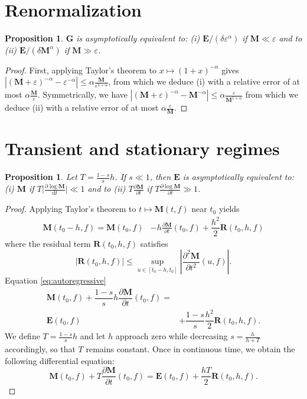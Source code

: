 \documentclass[journal]{IEEEtran}
\newtheorem{prop}[thm]{Proposition}
\begin{document}
\section{Renormalization}
\begin{prop}
$\mathbf{G}$ is asymptotically equivalent to: (i) $\mathbf{E} / (\delta \varepsilon^\alpha)$ if $\mathbf{M} \ll \varepsilon$ and to (ii) $\mathbf{E} / (\delta \mathbf{M}^\alpha)$ if $\mathbf{M} \gg \varepsilon$.
\end{prop}
\begin{proof}
First, applying Taylor's theorem to $x \mapsto (1+x)^{-\alpha}$ gives $\left \vert (\mathbf{M} + \varepsilon)^{-\alpha} - \varepsilon^{-\alpha} \right \vert \leq \alpha \frac{\mathbf{M}}{\varepsilon^{1+\alpha}}$, from which we deduce (i) with a relative error of at most $\alpha \frac{\mathbf{M}}{\varepsilon}$. Symmetrically, we have $\left \vert (\mathbf{M} + \varepsilon)^{-\alpha} - \mathbf{M}^{-\alpha} \right \vert \leq \alpha \frac{\varepsilon}{\mathbf{M}^{1+\alpha}}$ from which we deduce (ii) with a relative error of at most $\alpha \frac{\varepsilon}{\mathbf{M}}$.
\end{proof}

\section{Transient and stationary regimes}
\begin{prop}
Let $T=\frac{1-s}{s} h$.
If $s \ll 1$, then $\mathbf{E}$ is asymptotically equivalent to: (i) $\mathbf{M}$ if $T \vert\frac{\partial \log \mathbf{M}}{\mathrm{d}t} \vert \ll 1$ and to (ii) $T \frac{\partial\mathbf{M}}{\partial t}$ if $T \frac{\partial \log \mathbf{M}}{\partial t} \gg 1$.
\end{prop}
\begin{proof}
Applying Taylor's theorem to $t \mapsto \mathbf{M}(t,f)$ near $t_0$ yields
\begin{align}
\mathbf{M}(t_0-h,f)
=
\mathbf{M}(t_0,f) & - h \frac{\partial\mathbf{M}}{\partial t}(t_0,f) + \dfrac{h^2}{2} \mathbf{R}(t_0,h,f)
\end{align}
where the residual term $\mathbf{R}(t_0,h,f)$ satisfies
\begin{equation}
\vert \mathbf{R}(t_0,h,f) \vert
\leq
\sup_{u \in [t_0-h, t_0]}
\left \vert
\dfrac{\partial^2 \mathbf{M}}{\partial t^2}(u,f)
\right \vert.
\end{equation}
Equation \ref{eq:autoregressive}
\begin{align}
\mathbf{M}(t_0,f) 
+
\dfrac{1-s}{s} h \dfrac{\partial \mathbf{M}}{\partial t}(t_0,f)
 = & \nonumber \\
\mathbf{E}(t_0,f) & + 
\dfrac{1-s}{s} \dfrac{h^2}{2} \mathbf{R}(t_0,h,f).
\end{align}
We define $T=\frac{1-s}{s}h$ and let $h$ approach zero while decreasing $s = \frac{h}{h+T}$ accordingly, so that $T$ remains constant.
Once in continuous time, we obtain the following differential equation:
\begin{equation}
\mathbf{M}(t_0,f) + T \dfrac{\partial \mathbf{M}}{\partial t}(t_0,f)
=
\mathbf{E}(t_0,f) + \dfrac{h T}{2} \mathbf{R}(t_0,h,f).
\end{equation}
\end{proof}
\end{document}
